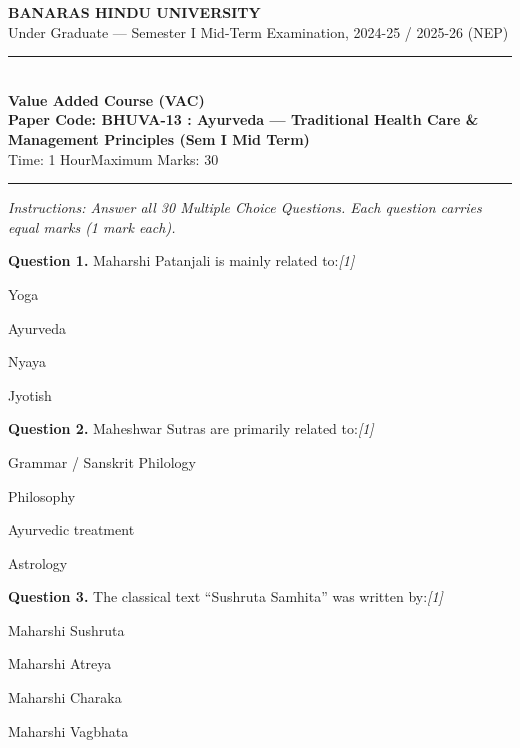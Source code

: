\documentclass[11pt,a4paper]{article}
\newcommand{\pts}[1]{\hfill   \textit{[#1]}}
\begin{document}
\begin{center}
  {\large\bfseries BANARAS HINDU UNIVERSITY}\\[2pt]
  {\normalsize Under Graduate --- Semester I Mid-Term Examination, 2024-25 / 2025-26 (NEP)}\\[6pt]
  \rule{0.8\linewidth}{0.5pt}\\[6pt]
  {\large\bfseries Value Added Course (VAC)}\\[4pt]
  {\large\bfseries Paper Code: BHUVA-13 : Ayurveda --- Traditional Health Care \& Management Principles (Sem I Mid Term)}\\[4pt]
  {\normalsize Time: 1 Hour\hfill Maximum Marks: 30}
\end{center}

\rule{\linewidth}{0.4pt}

\smallskip



\noindent   \textit{Instructions: Answer all 30 Multiple Choice Questions. Each question carries equal marks (1 mark each).}

\bigskip




\noindent   \textbf{Question 1.} Maharshi Patanjali is mainly related to:\pts{1}

\begin{parts}
  \item Yoga
  \item Ayurveda
  \item Nyaya
  \item Jyotish
\end{parts}

\medskip




\noindent   \textbf{Question 2.} Maheshwar Sutras are primarily related to:\pts{1}

\begin{parts}
  \item Grammar / Sanskrit Philology
  \item Philosophy
  \item Ayurvedic treatment
  \item Astrology
\end{parts}

\medskip




\noindent   \textbf{Question 3.} The classical text ``Sushruta Samhita'' was written by:\pts{1}

\begin{parts}
  \item Maharshi Sushruta
  \item Maharshi Atreya
  \item Maharshi Charaka
  \item Maharshi Vagbhata
\end{parts}
\end{document}
